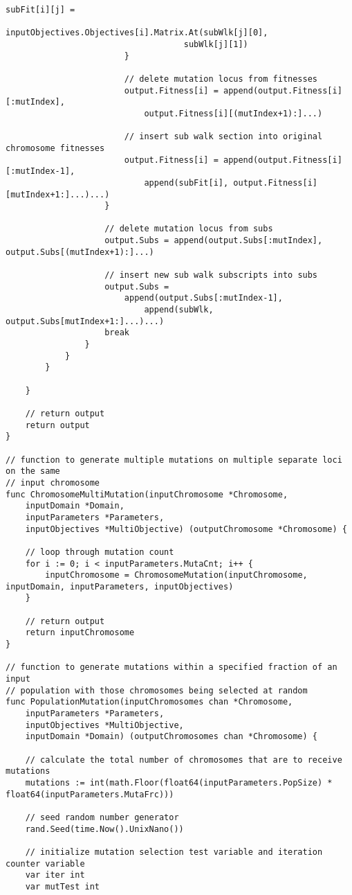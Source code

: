 \begin{lstlisting}[basicstyle=\tiny]
							subFit[i][j] = 
							    inputObjectives.Objectives[i].Matrix.At(subWlk[j][0], 
							        subWlk[j][1])
						}

						// delete mutation locus from fitnesses
						output.Fitness[i] = append(output.Fitness[i][:mutIndex], 
						    output.Fitness[i][(mutIndex+1):]...)

						// insert sub walk section into original chromosome fitnesses
						output.Fitness[i] = append(output.Fitness[i][:mutIndex-1], 
						    append(subFit[i], output.Fitness[i][mutIndex+1:]...)...)
					}

					// delete mutation locus from subs
					output.Subs = append(output.Subs[:mutIndex], output.Subs[(mutIndex+1):]...)

					// insert new sub walk subscripts into subs
					output.Subs = 
					    append(output.Subs[:mutIndex-1], 
					        append(subWlk, output.Subs[mutIndex+1:]...)...)
					break
				}
			}
		}

	}

	// return output
	return output
}

// function to generate multiple mutations on multiple separate loci on the same
// input chromosome
func ChromosomeMultiMutation(inputChromosome *Chromosome, 
    inputDomain *Domain, 
    inputParameters *Parameters, 
    inputObjectives *MultiObjective) (outputChromosome *Chromosome) {

	// loop through mutation count
	for i := 0; i < inputParameters.MutaCnt; i++ {
		inputChromosome = ChromosomeMutation(inputChromosome, inputDomain, inputParameters, inputObjectives)
	}

	// return output
	return inputChromosome
}

// function to generate mutations within a specified fraction of an input
// population with those chromosomes being selected at random
func PopulationMutation(inputChromosomes chan *Chromosome, 
    inputParameters *Parameters, 
    inputObjectives *MultiObjective, 
    inputDomain *Domain) (outputChromosomes chan *Chromosome) {

	// calculate the total number of chromosomes that are to receive mutations
	mutations := int(math.Floor(float64(inputParameters.PopSize) * float64(inputParameters.MutaFrc)))

	// seed random number generator
	rand.Seed(time.Now().UnixNano())

	// initialize mutation selection test variable and iteration counter variable
	var iter int
	var mutTest int


\end{lstlisting}
